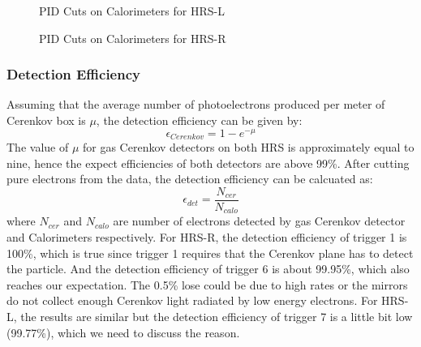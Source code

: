 \begin{figure}[htb]
\centerline{}
\caption[PID Cuts on Calorimeters for HRS-L]{\footnotesize{PID Cuts on Calorimeters for HRS-L}
\label{pid_hrsl}}
\end{figure}

\begin{figure}[htb]
\centerline{}
\caption[PID Cuts on Calorimeters for HRS-L]{\footnotesize{PID Cuts on Calorimeters for HRS-R}
\label{pid_hrsr}}
\end{figure}

\clearpage

\subsubsection{Detection Efficiency}
 Assuming that the average number of photoelectrons produced per meter of Cerenkov box is $\mu$, the detection efficiency can be given by:
\begin{equation}
 \epsilon_{Cerenkov} = 1 - e^{-\mu}
\end{equation}
The value of $\mu$ for gas Cerenkov detectors on both HRS is approximately equal to nine, hence the expect efficiencies of both detectors are above 99\%. After cutting pure electrons from the data, the detection efficiency can be calcuated as:
\begin{equation}
 \epsilon_{det} = \frac{N_{cer}}{N_{calo}}
\end{equation}
where $N_{cer}$ and $N_{calo}$ are number of electrons detected by gas Cerenkov detector and Calorimeters respectively. For HRS-R, the detection efficiency of trigger 1 is 100\%, which is true since trigger 1 requires that the Cerenkov plane has to detect the particle. And the detection efficiency of trigger 6 is about 99.95\%, which also reaches our expectation. The 0.5\% lose could be due to high rates or the mirrors  do not collect enough Cerenkov light radiated by low energy electrons. For HRS-L, the results are similar but the detection efficiency of trigger 7 is a little bit low (99.77\%), which we need to discuss the reason.

